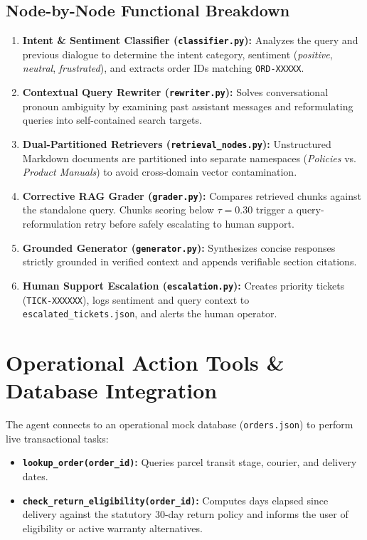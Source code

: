 \documentclass[11pt,a4paper]{article}
\begin{document}
\subsection{Node-by-Node Functional Breakdown}
\begin{enumerate}
    \item \textbf{Intent \& Sentiment Classifier (\texttt{classifier.py}):} Analyzes the query and previous dialogue to determine the intent category, sentiment (\textit{positive}, \textit{neutral}, \textit{frustrated}), and extracts order IDs matching \texttt{ORD-XXXXX}.
    \item \textbf{Contextual Query Rewriter (\texttt{rewriter.py}):} Solves conversational pronoun ambiguity by examining past assistant messages and reformulating queries into self-contained search targets.
    \item \textbf{Dual-Partitioned Retrievers (\texttt{retrieval\_nodes.py}):} Unstructured Markdown documents are partitioned into separate namespaces (\textit{Policies} vs. \textit{Product Manuals}) to avoid cross-domain vector contamination.
    \item \textbf{Corrective RAG Grader (\texttt{grader.py}):} Compares retrieved chunks against the standalone query. Chunks scoring below $\tau = 0.30$ trigger a query-reformulation retry before safely escalating to human support.
    \item \textbf{Grounded Generator (\texttt{generator.py}):} Synthesizes concise responses strictly grounded in verified context and appends verifiable section citations.
    \item \textbf{Human Support Escalation (\texttt{escalation.py}):} Creates priority tickets (\texttt{TICK-XXXXXX}), logs sentiment and query context to \texttt{escalated\_tickets.json}, and alerts the human operator.
\end{enumerate}

\section{Operational Action Tools \& Database Integration}
The agent connects to an operational mock database (\texttt{orders.json}) to perform live transactional tasks:
\begin{itemize}
    \item \textbf{\texttt{lookup\_order(order\_id)}:} Queries parcel transit stage, courier, and delivery dates.
    \item \textbf{\texttt{check\_return\_eligibility(order\_id)}:} Computes days elapsed since delivery against the statutory 30-day return policy and informs the user of eligibility or active warranty alternatives.
\end{itemize}
\end{document}
